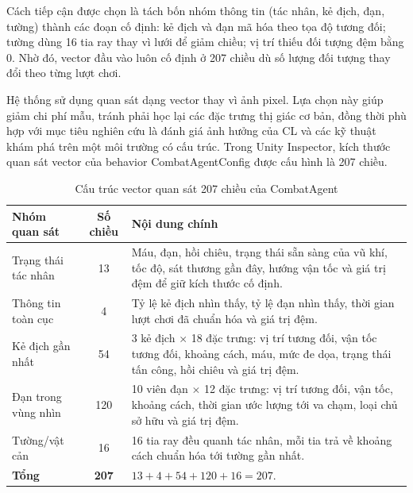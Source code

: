 Cách tiếp cận được chọn là tách bốn nhóm thông tin (tác nhân, kẻ địch, đạn, tường) thành các đoạn cố định: kẻ địch và đạn mã hóa theo tọa độ tương đối; tường dùng 16 tia ray thay vì lưới để giảm chiều; vị trí thiếu đối tượng đệm bằng 0. Nhờ đó, vector đầu vào luôn cố định ở 207 chiều dù số lượng đối tượng thay đổi theo từng lượt chơi.

Hệ thống sử dụng quan sát dạng vector thay vì ảnh pixel. Lựa chọn này giúp giảm chi phí mẫu, tránh phải học lại các đặc trưng thị giác cơ bản, đồng thời phù hợp với mục tiêu nghiên cứu là đánh giá ảnh hưởng của CL và các kỹ thuật khám phá trên một môi trường có cấu trúc. Trong Unity Inspector, kích thước quan sát vector của behavior CombatAgentConfig được cấu hình là 207 chiều.

\begin{table}[H]
    \centering
    \small
    \caption{Cấu trúc vector quan sát 207 chiều của CombatAgent}
    \label{tab:obs_207}
    \begin{tabular}{|p{4cm}|c|p{8cm}|}
        \hline
        \textbf{Nhóm quan sát} & \textbf{Số chiều} & \textbf{Nội dung chính} \\
        \hline
        Trạng thái tác nhân & 13 & Máu, đạn, hồi chiêu, trạng thái sẵn sàng của vũ khí, tốc độ, sát thương gần đây, hướng vận tốc và giá trị đệm để giữ kích thước cố định. \\
        \hline
        Thông tin toàn cục & 4 & Tỷ lệ kẻ địch nhìn thấy, tỷ lệ đạn nhìn thấy, thời gian lượt chơi đã chuẩn hóa và giá trị đệm. \\
        \hline
        Kẻ địch gần nhất & 54 & 3 kẻ địch $\times$ 18 đặc trưng: vị trí tương đối, vận tốc tương đối, khoảng cách, máu, mức đe dọa, trạng thái tấn công, hồi chiêu và giá trị đệm. \\
        \hline
        Đạn trong vùng nhìn & 120 & 10 viên đạn $\times$ 12 đặc trưng: vị trí tương đối, vận tốc, khoảng cách, thời gian ước lượng tới va chạm, loại chủ sở hữu và giá trị đệm. \\
        \hline
        Tường/vật cản & 16 & 16 tia ray đều quanh tác nhân, mỗi tia trả về khoảng cách chuẩn hóa tới tường gần nhất. \\
        \hline
        \textbf{Tổng} & \textbf{207} & $13 + 4 + 54 + 120 + 16 = 207$. \\
        \hline
    \end{tabular}
\end{table}


